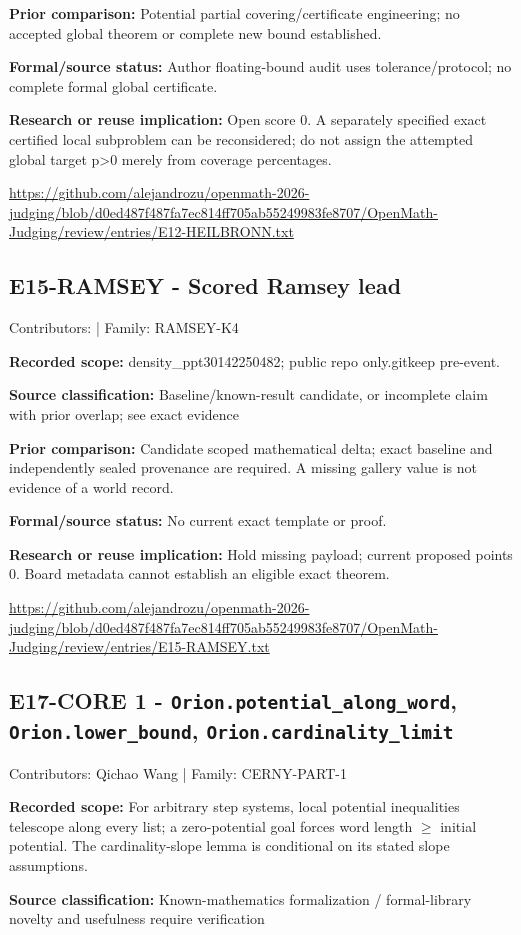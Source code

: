 \documentclass[11pt,a4paper]{article}
\begin{document}
\textbf{Prior comparison:} Potential partial covering/certificate engineering; no accepted global theorem or complete new bound established.

\textbf{Formal/source status:} Author floating-bound audit uses tolerance/protocol; no complete formal global certificate.

\textbf{Research or reuse implication:} Open score 0. A separately specified exact certified local subproblem can be reconsidered; do not assign the attempted global target p>0 merely from coverage percentages.

{\small \url{https://github.com/alejandrozu/openmath-2026-judging/blob/d0ed487f487fa7ec814ff705ab55249983fe8707/OpenMath-Judging/review/entries/E12-HEILBRONN.txt}\par}

\begin{samepage}
\subsection{E15-RAMSEY  -  Scored Ramsey lead}
{\small Contributors:  | Family: RAMSEY-K4\par}

\textbf{Recorded scope:} density\_ppt30142250482; public repo only.gitkeep pre-event.

\end{samepage}
\textbf{Source classification:} Baseline/known-result candidate, or incomplete claim with prior overlap; see exact evidence

\textbf{Prior comparison:} Candidate scoped mathematical delta; exact baseline and independently sealed provenance are required. A missing gallery value is not evidence of a world record.

\textbf{Formal/source status:} No current exact template or proof.

\textbf{Research or reuse implication:} Hold missing payload; current proposed points 0. Board metadata cannot establish an eligible exact theorem.

{\small \url{https://github.com/alejandrozu/openmath-2026-judging/blob/d0ed487f487fa7ec814ff705ab55249983fe8707/OpenMath-Judging/review/entries/E15-RAMSEY.txt}\par}

\begin{samepage}
\subsection{E17-CORE 1  -  \texttt{Orion.potential\_along\_word}, \texttt{Orion.lower\_bound}, \texttt{Orion.cardinality\_limit}}
{\small Contributors: Qichao Wang | Family: CERNY-PART-1\par}

\textbf{Recorded scope:} For arbitrary step systems, local potential inequalities telescope along every list; a zero-potential goal forces word length \ensuremath{\geq} initial potential. The cardinality-slope lemma is conditional on its stated slope assumptions.

\end{samepage}
\textbf{Source classification:} Known-mathematics formalization / formal-library novelty and usefulness require verification
\end{document}
